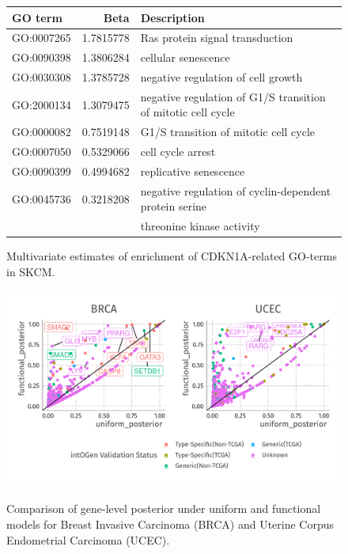 \begin{figure}
    \centering
\begin{tabular}{l|r|l}
\hline
GO term & Beta & Description\\
\hline
GO:0007265 & 1.7815778 & Ras protein signal transduction\\
\hline
GO:0090398 & 1.3806284 & cellular senescence\\
\hline
GO:0030308 & 1.3785728 & negative regulation of cell growth\\
\hline
GO:2000134 & 1.3079475 & negative regulation of G1/S transition of mitotic cell cycle\\
\hline
GO:0000082 & 0.7519148 & G1/S transition of mitotic cell cycle\\
\hline
GO:0007050 & 0.5329066 & cell cycle arrest\\
\hline
GO:0090399 & 0.4994682 & replicative senescence\\
\hline
  GO:0045736 & 0.3218208 & negative regulation of cyclin-dependent protein serine \\
        & & threonine kinase activity\\
\hline
\end{tabular}\label{tab:CDKN1A_features}
\caption{Multivariate estimates of enrichment of CDKN1A-related GO-terms in SKCM.}
\end{figure}

\begin{figure}
    \centering
    \includegraphics[width=.9\linewidth]{img/fgem_posterior_plot.png}\label{fig:fgem_posterior}
    \caption{Comparison of gene-level posterior under uniform and functional models for  Breast Invasive Carcinoma (BRCA) and Uterine Corpus Endometrial Carcinoma (UCEC).}
\end{figure}

